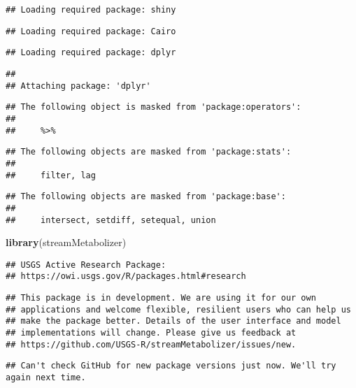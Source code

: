 \documentclass[]{article}
\newenvironment{Shaded}{\begin{snugshade}}{\end{snugshade}}
\newcommand{\KeywordTok}[1]{\textcolor[rgb]{0.13,0.29,0.53}{\textbf{#1}}}
\newcommand{\NormalTok}[1]{#1}
\begin{document}
\begin{verbatim}
## Loading required package: shiny
\end{verbatim}

\begin{verbatim}
## Loading required package: Cairo
\end{verbatim}

\begin{verbatim}
## Loading required package: dplyr
\end{verbatim}

\begin{verbatim}
## 
## Attaching package: 'dplyr'
\end{verbatim}

\begin{verbatim}
## The following object is masked from 'package:operators':
## 
##     %>%
\end{verbatim}

\begin{verbatim}
## The following objects are masked from 'package:stats':
## 
##     filter, lag
\end{verbatim}

\begin{verbatim}
## The following objects are masked from 'package:base':
## 
##     intersect, setdiff, setequal, union
\end{verbatim}

\begin{Shaded}
\begin{Highlighting}[]
\KeywordTok{library}\NormalTok{(streamMetabolizer)}
\end{Highlighting}
\end{Shaded}

\begin{verbatim}
## USGS Active Research Package:
## https://owi.usgs.gov/R/packages.html#research
\end{verbatim}

\begin{verbatim}
## This package is in development. We are using it for our own
## applications and welcome flexible, resilient users who can help us
## make the package better. Details of the user interface and model
## implementations will change. Please give us feedback at
## https://github.com/USGS-R/streamMetabolizer/issues/new.
\end{verbatim}

\begin{verbatim}
## Can't check GitHub for new package versions just now. We'll try again next time.
\end{verbatim}
\end{document}
